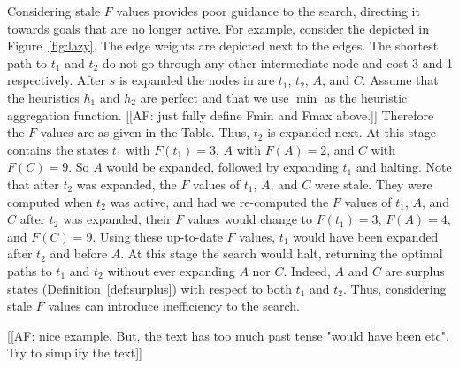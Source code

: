 Considering stale $F$ values provides poor guidance to the search, directing it towards goals that are no longer active.
For example, consider the \kgs depicted in Figure~\ref{fig:lazy}.
The edge weights are depicted next to the edges.
The shortest path to $t_1$ and $t_2$ do not go through any other intermediate node and cost 3 and 1 respectively.
After $s$ is expanded the nodes in \open are $t_1$, $t_2$, $A$, and $C$.
Assume that the heuristics $h_1$ and $h_2$ are perfect and that we use $\min$ as the heuristic aggregation function. [[AF: just fully define Fmin and Fmax above.]]
Therefore the $F$ values are as given in the Table.
Thus, $t_2$ is expanded next.
At this stage \open contains the states $t_1$ with $F(t_1) = 3$, $A$ with $F(A) = 2$, and $C$ with $F(C) = 9$.
So $A$ would be expanded, followed by expanding $t_1$ and halting.
Note that after $t_2$ was expanded, the $F$ values of $t_1$, $A$, and $C$ were stale.
They were computed when $t_2$ was active, and had we re-computed the $F$ values of $t_1$, $A$, and $C$ after $t_2$ was expanded, their $F$ values would change to $F(t_1) = 3$, $F(A) = 4$, and $F(C) = 9$.
Using these up-to-date $F$ values, $t_1$ would have been expanded after $t_2$ and before $A$.
At this stage the search would halt, returning the optimal paths to $t_1$ and $t_2$ without ever expanding $A$ nor $C$.
Indeed, $A$ and $C$ are surplus states (Definition~\ref{def:surplus}) with respect to both $t_1$ and $t_2$.
Thus, considering stale $F$ values can introduce inefficiency to the search.

[[AF: nice example. But, the text has too much past tense "would have been etc". Try to simplify the text]]


